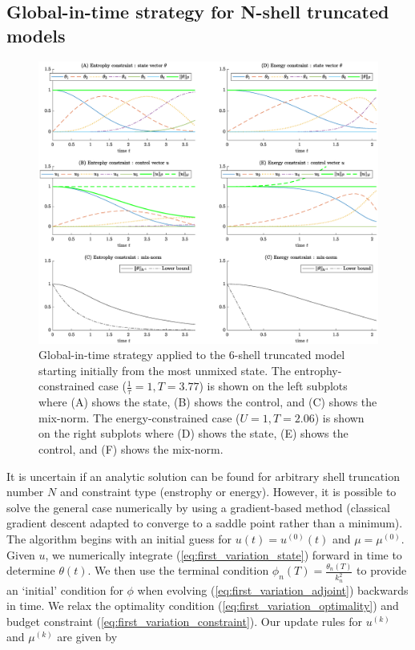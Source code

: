 \subsection{Global-in-time strategy for N-shell truncated models}
\label{sec:ND_GIT_Nshell}
\begin{figure}[!ht]
	\centering
	\includegraphics[width=1.0\textwidth]{ch-shellmodel/images/git_muic}
	\caption{Global-in-time strategy applied to the 6-shell truncated model starting initially from the most unmixed state. The entrophy-constrained case ($\frac{1}{\tau}=1, T=3.77 $) is shown on the left subplots where (A) shows the state, (B) shows the control, and (C) shows the mix-norm. The energy-constrained case ($U=1, T= 2.06$) is shown on the right subplots where (D) shows the state, (E) shows the control, and (F) shows the mix-norm.  }
	\label{fig:git_muic}
\end{figure}



It is uncertain if an analytic solution can be found for arbitrary shell truncation number $N$ and constraint type (enstrophy or energy). However, it is possible to solve the general case numerically by using a gradient-based method (classical gradient descent adapted to converge to a saddle point rather than a minimum).  The algorithm begins with an initial guess for $u(t)=u^{(0)}(t)$ and $\mu=\mu^{(0)}$. Given $u$, we numerically integrate (\ref{eq:first_variation_state}) forward in time to determine $\theta(t)$. We then use the terminal condition $\phi_{n}(T)=\frac{\theta_{n}(T)}{k_{n}^2}$ to provide an `initial' condition for $\phi$ when evolving (\ref{eq:first_variation_adjoint}) backwards in time. We relax the optimality condition (\ref{eq:first_variation_optimality}) and budget constraint (\ref{eq:first_variation_constraint}). Our update rules for $u^{(k)}$ and $\mu^{(k)}$ are given by


